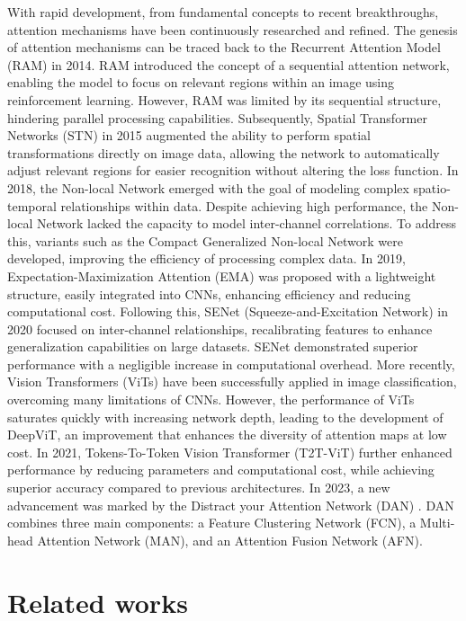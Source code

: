 \documentclass[pdflatex,sn-mathphys-num]{sn-jnl}%
\theoremstyle{thmstyleone}%
\theoremstyle{thmstyletwo}%
\theoremstyle{thmstylethree}%
\begin{document}
With rapid development, from fundamental concepts to recent breakthroughs, attention mechanisms have been continuously researched and refined. The genesis of attention mechanisms can be traced back to the Recurrent Attention Model (RAM) in 2014. RAM introduced the concept of a sequential attention network, enabling the model to focus on relevant regions within an image using reinforcement learning. However, RAM was limited by its sequential structure, hindering parallel processing capabilities. Subsequently, Spatial Transformer Networks (STN) in 2015 augmented the ability to perform spatial transformations directly on image data, allowing the network to automatically adjust relevant regions for easier recognition without altering the loss function. In 2018, the Non-local Network \cite{b16} emerged with the goal of modeling complex spatio-temporal relationships within data. Despite achieving high performance, the Non-local Network lacked the capacity to model inter-channel correlations. To address this, variants such as the Compact Generalized Non-local Network were developed, improving the efficiency of processing complex data. In 2019, Expectation-Maximization Attention (EMA) \cite{b17} was proposed with a lightweight structure, easily integrated into CNNs, enhancing efficiency and reducing computational cost. Following this, SENet (Squeeze-and-Excitation Network) \cite{b18} in 2020 focused on inter-channel relationships, recalibrating features to enhance generalization capabilities on large datasets. SENet demonstrated superior performance with a negligible increase in computational overhead. More recently, Vision Transformers (ViTs) \cite{b19} have been successfully applied in image classification, overcoming many limitations of CNNs. However, the performance of ViTs saturates quickly with increasing network depth, leading to the development of DeepViT, an improvement that enhances the diversity of attention maps at low cost. In 2021, Tokens-To-Token Vision Transformer (T2T-ViT) \cite{b20} further enhanced performance by reducing parameters and computational cost, while achieving superior accuracy compared to previous architectures. In 2023, a new advancement was marked by the Distract your Attention Network (DAN) \cite{b21}. DAN combines three main components: a Feature Clustering Network (FCN), a Multi-head Attention Network (MAN), and an Attention Fusion Network (AFN).

\section{Related works}\label{sec2}
\end{document}
